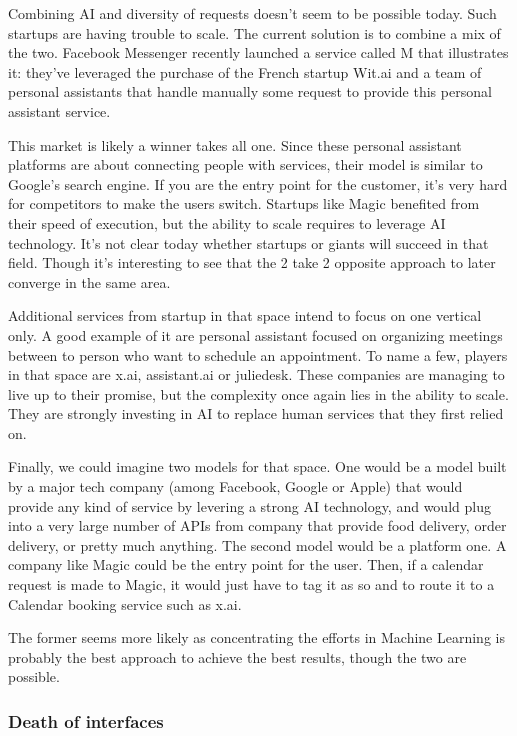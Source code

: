 \documentclass[12pt]{article}
\begin{document}
Combining AI and diversity of requests doesn't seem to be possible today. Such
startups are having trouble to scale. The current solution is to combine a mix
of the two. Facebook Messenger recently launched a service called M that
illustrates it: they've leveraged the purchase of the French startup Wit.ai and
a team of personal assistants that handle manually some request to provide this
personal assistant service.

This market is likely a winner takes all one. Since these personal assistant
platforms are about connecting people with services, their model is similar to
Google's search engine. If you are the entry point for the customer, it's very
hard for competitors to make the users switch. Startups like Magic benefited
from their speed of execution, but the ability to scale requires to leverage AI
technology. It's not clear today whether startups or giants will succeed in that
field. Though it's interesting to see that the 2 take 2 opposite approach to
later converge in the same area.

Additional services from startup in that space intend to focus on one vertical
only. A good example of it are personal assistant focused on organizing meetings
between to person who want to schedule an appointment. To name a few, players in
that space are x.ai, assistant.ai or juliedesk. These companies are managing to
live up to their promise, but the complexity once again lies in the ability to
scale. They are strongly investing in AI to replace human services that they
first relied on.

Finally, we could imagine two models for that space.
One would be a model built by a major tech company (among Facebook, Google or
Apple) that would provide any kind of service by levering a strong AI
technology, and would plug into a very large number of APIs from company that
provide food delivery, order delivery, or pretty much anything.
The second model would be a platform one. A company like Magic could be the
entry point for the user. Then, if a calendar request is made to Magic, it would
just have to tag it as so and to route it to a Calendar booking service such as
x.ai.

The former seems more likely as concentrating the efforts in Machine Learning is
probably the best approach to achieve the best results, though the two are
possible.

\subsubsection{Death of interfaces}
\end{document}
